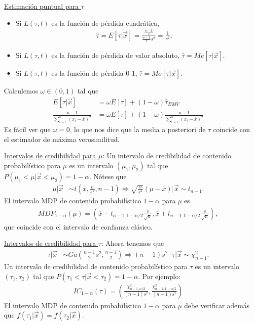 \underline{Estimación puntual para $\tau$}
\begin{itemize}
    \item Si $L(\tau,t)$ es la función de pérdida cuadrática,
          \begin{align*}
              \widehat{\tau} = E[\tau |  \vec{x}] = \frac{\frac{n-1}{2}}{\frac{n-1}{2}s^2} = \frac{1}{s^2}.
          \end{align*}
    \item Si $L(\tau,t)$ es la función de pérdida de valor absoluto, $\widehat{\tau} = Me[\tau |  \vec{x}]$.
    \item Si $L(\tau,t)$ es la función de pérdida 0-1, $ \widehat{\tau} = Mo[\tau |  \vec{x}]$.
\end{itemize}
Calculemos $\omega \in (0,1)$ tal que
\begin{align*}
    E[\tau  | \vec{x}]                                 & = \omega E[\tau]  + (1 - \omega) \widehat{\tau }_{EMV}                          \\
    \frac{n-1}{ \sum_{i=1}^{n} (x_i - \overline{x})^2} & = \omega E[\tau] + (1-\omega)\frac{n-1}{ \sum_{i=1}^{n} (x_i - \overline{x})^2}
\end{align*}
Es fácil ver que $\omega = 0$, lo que nos dice que la media a posteriori de $\tau$ coincide con el estimador de máxima verosimilitud.

\underline{Intervalos de credibilidad para $\mu$}: Un intervalo de credibilidad de contenido probabilístico para $\mu$ es un intervalo $(\mu_1,\mu_2)$ tal que $P(\mu_1 < \mu | \vec{x} < \mu_2) = 1 - \alpha$. Nótese que
\begin{align*}
    \mu | \vec{x} & \sim t \left( \overline{x}, \frac{n}{s^2},n-1 \right) \Longrightarrow \sqrt{\frac{n}{s^2}}(\mu - \overline{x}) | \vec{x} \sim t_{n-1}.
\end{align*}
El intervalo MDP de contenido probabilístico $1-\alpha$ para $\mu$ es
\begin{align*}
    MDP_{1-\alpha}(\mu) = \left( \overline{x} - t_{n-1, 1-\alpha/2}\frac{s}{\sqrt{n}}, \overline{x} + t_{n-1, 1-\alpha/2}\frac{s}{\sqrt{n}} \right),
\end{align*}
que coincide con el intervalo de confianza clásico.

\underline{Intervalos de credibilidad para $\tau$}: Ahora tenemos que
\begin{align*}
    \tau | \vec{x} & \sim Ga\left( \frac{n-1}{2}s^2, \frac{n-1}{2} \right) \Longrightarrow (n-1)s^2 \cdot \tau | \vec{x} \sim \chi^2_{n-1}.
\end{align*}
Un intervalo de credibilidad de contenido probabilístico para $\tau$ es un intervalo $(\tau_1,\tau_2)$ tal que $P(\tau_1 < \tau | \vec{x} < \tau_2) = 1 - \alpha$. Por ejemplo:
\begin{align*}
    IC_{1-\alpha}(\tau) = \left( \frac{\chi^2_{n-1, \alpha/2}}{(n-1)s^2}, \frac{\chi^2_{n-1,1- \alpha/2}}{(n-1)s^2} \right)
\end{align*}
El intervalo MDP de contenido probabilístico $1-\alpha$ para $\mu$ debe verificar además que $f(\tau_1 | \vec{x}) = f(\tau_2 | \vec{x})$.

